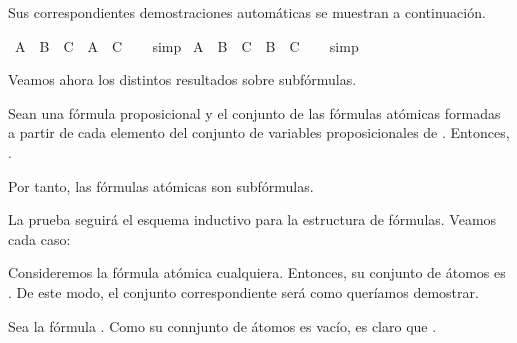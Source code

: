 \begin{isabellebody}
%
\endisatagproof
{\isafoldproof}%
%
\isadelimproof
%
\endisadelimproof
%
\begin{isamarkuptext}%
Sus correspondientes demostraciones automáticas se muestran a 
  continuación.%
\end{isamarkuptext}\isamarkuptrue%
\isamarkupfalse%
\ {\isachardoublequoteopen}A\ {\isasymunion}\ B\ {\isasymsubseteq}\ C\ {\isasymLongrightarrow}\ A\ {\isasymsubseteq}\ C{\isachardoublequoteclose}\isanewline
%
\isadelimproof
\ \ %
\endisadelimproof
%
\isatagproof
{}\isamarkupfalse%
\ simp%
\endisatagproof
{\isafoldproof}%
%
\isadelimproof
\isanewline
%
\endisadelimproof
\isanewline
{}\isamarkupfalse%
\ {\isachardoublequoteopen}A\ {\isasymunion}\ B\ {\isasymsubseteq}\ C\ {\isasymLongrightarrow}\ B\ {\isasymsubseteq}\ C{\isachardoublequoteclose}\isanewline
%
\isadelimproof
\ \ %
\endisadelimproof
%
\isatagproof
{}\isamarkupfalse%
\ simp%
\endisatagproof
{\isafoldproof}%
%
\isadelimproof
%
\endisadelimproof
%
\begin{isamarkuptext}%
Veamos ahora los distintos resultados sobre subfórmulas.

  \begin{lema}
    Sean  una fórmula proposicional y  el conjunto de las 
    fórmulas atómicas formadas a partir de cada elemento del conjunto 
    de variables proposicionales de . 
    Entonces, .

    Por tanto, las fórmulas atómicas son subfórmulas.
  \end{lema}

  \begin{demostracion}
    La prueba seguirá el esquema inductivo para la estructura de 
    fórmulas. Veamos cada caso:
  
    Consideremos la fórmula atómica  cualquiera. Entonces, su
    conjunto de átomos es . De este modo, el conjunto  
    correspondiente será  como 
    queríamos 
    demostrar.

    Sea la fórmula \isa{{\isasymbottom}}. Como su connjunto de átomos es vacío, es claro 
    que .


\end{demostracion}
\end{isamarkuptext}
\end{isabellebody}

